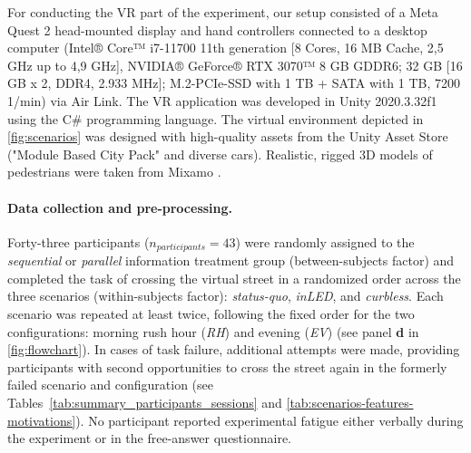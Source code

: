 For conducting the VR part of the experiment, our setup consisted of a Meta Quest 2 head-mounted display and hand controllers connected to a desktop computer (Intel® Core™ i7-11700 11th generation [8 Cores, 16 MB Cache, 2,5 GHz up to 4,9 GHz], NVIDIA® GeForce® RTX 3070™ 8 GB GDDR6; 32 GB [16 GB x 2, DDR4, 2.933 MHz]; M.2-PCIe-SSD with 1 TB + SATA with 1 TB, 7200 1/min) via Air Link. 
The VR application was developed in Unity 2020.3.32f1 using the C\# programming language. The virtual environment depicted in \autoref{fig:scenarios} was designed with high-quality assets from the Unity Asset Store ("Module Based City Pack" and diverse cars). Realistic, rigged 3D models of pedestrians were taken from Mixamo \cite{mixamo}.



\paragraph{Data collection and pre-processing.}

Forty-three participants ($n_{participants}=43$) were randomly assigned to the \emph{sequential} or \emph{parallel} information treatment group (between-subjects factor) and completed the task of crossing the virtual street in a randomized order across the three scenarios (within-subjects factor): \emph{status-quo}, \emph{inLED}, and \emph{curbless}. Each scenario was repeated at least twice, following the fixed order for the two configurations: morning rush hour (\emph{RH}) and evening (\emph{EV}) (see panel \textbf{d} in \autoref{fig:flowchart}). In cases of task failure, additional attempts were made, providing participants with second opportunities to cross the street again in the formerly failed scenario and configuration (see Tables~\ref{tab:summary_participants_sessions} and \ref{tab:scenarios-features-motivations}). No participant reported experimental fatigue either verbally during the experiment or in the free-answer questionnaire.

